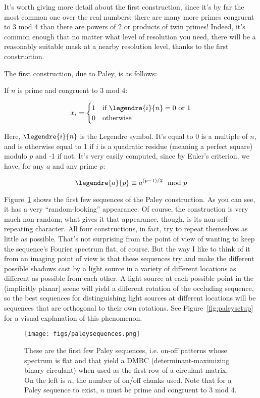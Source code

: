 It's worth giving more detail about the first construction, since it's by far the most common one over the real numbers; there are many more primes congruent to 3 mod 4 than there are powers of 2 or products of twin primes! Indeed, it's common enough that no matter what level of resolution you need, there will be a reasonably suitable mask at a nearby resolution level, thanks to the first construction.

The first construction, due to Paley, is as follows:

If $n$ is prime and congruent to 3 mod 4:

\[
  x_i =
  \begin{cases}
                                   1 & \text{if } \legendre{i}{n} = 0 \text{ or } 1 \\
                                   0 & \text{otherwise} \\
  \end{cases}
\]

Here, $\legendre{i}{n}$ is the Legendre symbol. It's equal to 0 is a multiple of $n$, and is otherwise equal to 1 if $i$ is a quadratic residue (meaning a perfect square) modulo $p$ and -1 if not. It's very easily computed, since by Euler's criterion, we have, for any $a$ and any prime $p$:

$$\legendre{a}{p} \equiv a^{(p-1)/2} \mod p$$

Figure~\ref{fig:paleysequences} shows the first few sequences of the Paley construction. As you can see, it has a very ``random-looking'' appearance. Of course, the construction is very much non-random; what gives it that appearance, though, is its non-self-repeating character. All four constructions, in fact, try to repeat themselves as little as possible. That's not surprising from the point of view of wanting to keep the sequence's Fourier spectrum flat, of course. But the way I like to think of it from an imaging point of view is that these sequences try and make the different possible shadows cast by a light source in a variety of different locations as different as possible from each other. A light source at each possible point in the (implicitly planar) scene will yield a different rotation of the occluding sequence, so the best sequences for distinguishing light sources at different locations will be sequences that are orthogonal to their own rotations. See Figure~\ref{fig:paleysetup} for a visual explanation of this phenomenon.

\begin{figure}
\begin{center}
\texttt{[image: figs/paleysequences.png]}
\caption{These are the first few Paley sequences, i.e. on-off patterns whose spectrum is flat and that yield a DMBC (determinant-maximizing binary circulant) when used as the first row of a circulant matrix. On the left is $n$, the number of on/off chunks used. Note that for a Paley sequence to exist, $n$ must be prime and congruent to 3 mod 4.\label{fig:paleysequences}}
\end{center}
\end{figure}

